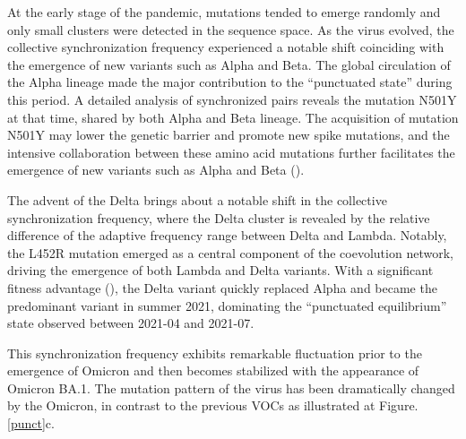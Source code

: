 \documentclass{sysbio}%
\begin{document}
At the early stage of the pandemic, mutations tended to emerge randomly and only small clusters were detected in the sequence space. As the virus evolved, the collective synchronization frequency experienced a notable shift coinciding with the emergence of new variants such as Alpha and Beta. The global circulation of the Alpha lineage made the major contribution to the “punctuated state” during this period. A detailed analysis of synchronized pairs reveals the mutation N501Y at that time, shared by both Alpha and Beta lineage. The acquisition of mutation N501Y may lower the genetic barrier and promote new spike mutations, and the intensive collaboration between these amino acid mutations further facilitates the emergence of new variants such as Alpha and Beta (\cite{484-501,epistasis_compensatory}). 



The advent of the Delta brings about a notable shift in the collective synchronization frequency, where the Delta cluster is revealed by the relative difference of the adaptive frequency range between Delta and Lambda. Notably, the L452R mutation emerged as a central component of the coevolution network, driving the emergence of both Lambda and Delta variants.
With a significant fitness advantage (\cite{delta_fh,delta_trans}), the Delta variant quickly replaced Alpha and became the predominant variant in summer 2021, dominating the “punctuated equilibrium” state observed between 2021-04 and 2021-07. 

This synchronization frequency exhibits remarkable fluctuation prior to the emergence of Omicron and then becomes stabilized with the appearance of Omicron BA.1. The mutation pattern of the virus has been dramatically changed by the Omicron, in contrast to the previous VOCs as illustrated at Figure. \ref{punct}c.
\end{document}
